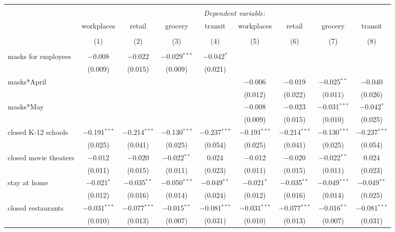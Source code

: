 \begin{tabular}{@{\extracolsep{1pt}}lcccccccc} 
\\[-1.8ex]\hline 
\hline \\[-1.8ex] 
 & \multicolumn{8}{c}{\textit{Dependent variable:}} \\ 
\cline{2-9} 
 & workplaces & retail & grocery & transit & workplaces & retail & grocery & transit \\ 
\\[-1.8ex] & (1) & (2) & (3) & (4) & (5) & (6) & (7) & (8)\\ 
\hline \\[-1.8ex] 
 masks for employees & $-$0.008 & $-$0.022 & $-$0.029$^{***}$ & $-$0.042$^{*}$ &  &  &  &  \\ 
  & (0.009) & (0.015) & (0.009) & (0.021) &  &  &  &  \\ 
  masks*April &  &  &  &  & $-$0.006 & $-$0.019 & $-$0.025$^{**}$ & $-$0.040 \\ 
  &  &  &  &  & (0.012) & (0.022) & (0.011) & (0.026) \\ 
  masks*May &  &  &  &  & $-$0.008 & $-$0.023 & $-$0.031$^{***}$ & $-$0.042$^{*}$ \\ 
  &  &  &  &  & (0.009) & (0.015) & (0.010) & (0.025) \\ 
  closed K-12 schools & $-$0.191$^{***}$ & $-$0.214$^{***}$ & $-$0.130$^{***}$ & $-$0.237$^{***}$ & $-$0.191$^{***}$ & $-$0.214$^{***}$ & $-$0.130$^{***}$ & $-$0.237$^{***}$ \\ 
  & (0.025) & (0.041) & (0.025) & (0.054) & (0.025) & (0.041) & (0.025) & (0.054) \\ 
  closed movie theaters & $-$0.012 & $-$0.020 & $-$0.022$^{**}$ & 0.024 & $-$0.012 & $-$0.020 & $-$0.022$^{**}$ & 0.024 \\ 
  & (0.011) & (0.015) & (0.011) & (0.023) & (0.011) & (0.015) & (0.011) & (0.023) \\ 
  stay at home & $-$0.021$^{*}$ & $-$0.035$^{**}$ & $-$0.050$^{***}$ & $-$0.049$^{**}$ & $-$0.021$^{*}$ & $-$0.035$^{**}$ & $-$0.049$^{***}$ & $-$0.049$^{**}$ \\ 
  & (0.012) & (0.016) & (0.014) & (0.024) & (0.012) & (0.016) & (0.014) & (0.025) \\ 
  closed restaurants & $-$0.031$^{***}$ & $-$0.077$^{***}$ & $-$0.015$^{**}$ & $-$0.081$^{***}$ & $-$0.031$^{***}$ & $-$0.077$^{***}$ & $-$0.016$^{**}$ & $-$0.081$^{***}$ \\ 
  & (0.010) & (0.013) & (0.007) & (0.031) & (0.010) & (0.013) & (0.007) & (0.031) \\ 

\end{tabular}
